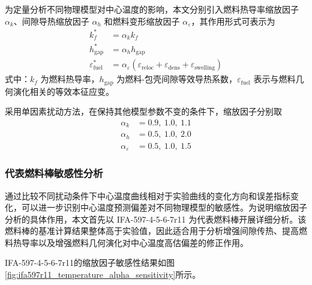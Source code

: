 为定量分析不同物理模型对中心温度的影响，本文分别引入燃料热导率缩放因子 \(\alpha_k\)、间隙导热缩放因子 \(\alpha_h\) 和燃料变形缩放因子 \(\alpha_\varepsilon\)，其作用形式可表示为
\begin{align}
	k_f^\ast &= \alpha_k k_f \nonumber \\
	h_\mathrm{gap}^\ast &= \alpha_h h_\mathrm{gap} \nonumber \\
	\varepsilon^\ast_\mathrm{fuel}
	&=
	\alpha_\varepsilon
	\left(
	\varepsilon_\mathrm{reloc}
	+
	\varepsilon_\mathrm{dens}
	+
	\varepsilon_\mathrm{swelling}
	\right) \label{eq:fuel_params}
\end{align}
\noindent 式中：\(k_f\) 为燃料热导率，\(h_\mathrm{gap}\) 为燃料-包壳间隙等效导热系数，\(\varepsilon_\mathrm{fuel}\) 表示与燃料几何演化相关的等效本征应变。

采用单因素扰动方法，在保持其他模型参数不变的条件下，缩放因子分别取
\begin{align}
	\alpha_k &= 0.9,\ 1.0,\ 1.1 \nonumber \\
	\alpha_h &= 0.5,\ 1.0,\ 2.0 \nonumber \\
	\alpha_\varepsilon &= 0.5,\ 1.0,\ 1.5 \label{eq:alpha_params}
\end{align}

\subsubsection{代表燃料棒敏感性分析}

通过比较不同扰动条件下中心温度曲线相对于实验曲线的变化方向和误差指标变化，可以进一步识别中心温度预测偏差对不同物理模型的敏感性。为说明缩放因子分析的具体作用，本文首先以 IFA-597-4-5-6-7r11 为代表燃料棒开展详细分析。该燃料棒的基准计算结果整体高于实验值，因此适合用于分析增强间隙传热、提高燃料热导率以及增强燃料几何演化对中心温度高估偏差的修正作用。

IFA-597-4-5-6-7r11的缩放因子敏感性结果如图\ref{fig:ifa597r11_temperature_alpha_sensitivity}所示。

